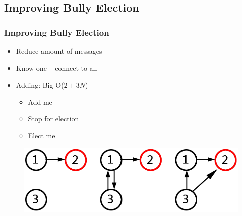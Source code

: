 \documentclass{beamer}
\begin{document}
\subsection{Improving Bully Election}
	\begin{frame}
		\frametitle{Improving Bully Election}
		
		\begin{itemize}
		\item Reduce amount of messages
		\item Know one -- connect to all
		\item Adding: Big-O($2+3N$)
		
			\begin{itemize}
			\item Add me
			\item Stop for election
			\item Elect me
			\end{itemize}
		
		\end{itemize}
		
		\begin{figure}[hbtp]
		\centering
		\includegraphics[scale=0.4]{RMI-Smart-Election}
		\end{figure}		

	\end{frame}
\end{document}
